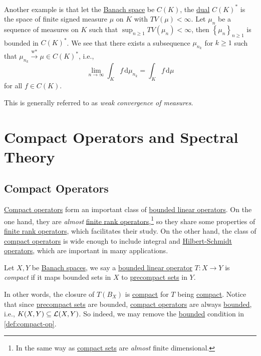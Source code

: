 Another example is that let the \hyperref[def:Banach-space]{Banach space} be \(C(K)\), the \hyperref[def:dual-space]{dual} \(C(K)^{\ast} \) is the space of finite signed measure \(\mu\) on \(K\) with \(TV(\mu )< \infty \). Let \(\mu _n\) be a sequence of measures on \(K\) such that \(\sup _{n\geq 1} TV(\mu _n) < \infty \), then \(\left\{ \mu _n \right\}_{n\geq 1} \) is bounded in \(C(K)^{\ast} \). We see that there exists a subsequence \(\mu _{n_k}\) for \(k\geq 1\) such that \(\mu _{n_k}\overset{\text{w*}}{\to } \mu \in C(K)^{\ast} \), i.e.,
\[
	\lim_{n \to \infty} \int _K f\,\mathrm{d} \mu _{n_k} = \int _K f\,\mathrm{d} \mu
\]
for all \(f\in C(K)\).

\begin{note}
	This is generally referred to as \emph{weak convergence of measures}.
\end{note}

\chapter{Compact Operators and Spectral Theory}

\section{Compact Operators}
\hyperref[def:compact-op]{Compact operators} form an important class of \hyperref[def:bounded-linear-op]{bounded linear operators}. On the one hand, they are \emph{almost} \hyperref[rmk:finite-rank-op]{finite rank operators},\footnote{In the same way as \hyperref[def:compact]{compact sets} are \emph{almost} finite dimensional.} so they share some properties of \hyperref[rmk:finite-rank-op]{finite rank operators}, which facilitates their study. On the other hand, the class of \hyperref[def:compact-op]{compact operators} is wide enough to include integral and \hyperref[def:Hilbert-Schmidt-op]{Hilbert-Schmidt operators}, which are important in many applications.

\begin{definition}\label{def:compact-op}
	Let \(X, Y\) be \hyperref[def:Banach-space]{Banach spaces}, we say a \hyperref[def:bounded-linear-op]{bounded linear operator} \(T\colon X\to Y\) is \emph{compact} if it maps bounded sets in \(X\) to \hyperref[def:precompact]{precompact sets} in \(Y\).
\end{definition}

In other words, the closure of \(T(B_X)\) is \hyperref[def:compact]{compact} for \(T\) being \hyperref[def:compact-op]{compact}. Notice that since \hyperref[def:precompact]{precompact sets} are bounded, \hyperref[def:compact-op]{compact operators} are always \hyperref[def:bounded-map]{bounded}, i.e., \(K(X, Y)\subseteq \mathcal{\MakeUppercase{l}} (X, Y)\). So indeed, we may remove the \hyperref[def:bounded-map]{bounded} condition in \autoref{def:compact-op}.

